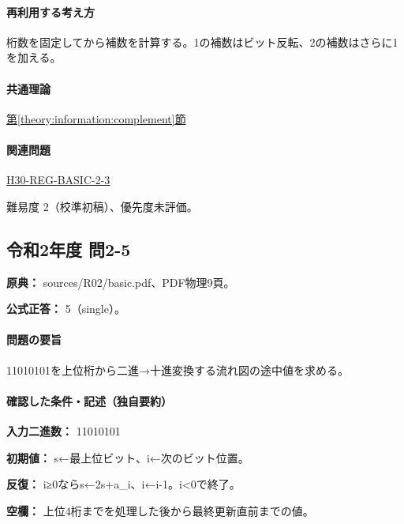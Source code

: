 \paragraph{再利用する考え方} 桁数を固定してから補数を計算する。1の補数はビット反転、2の補数はさらに1を加える。

\paragraph{共通理論} \hyperref[theory:information:complement]{第\ref*{theory:information:complement}節}

\paragraph{関連問題} \hyperref[q:h30-reg-basic-2-3]{H30-REG-BASIC-2-3}

\par 難易度 2（校準初稿）、優先度未評価。

\subsection{令和2年度 問2-5}
\label{q:r02-reg-basic-2-5}

\noindent\textbf{原典：} sources/R02/basic.pdf、PDF物理9頁。

\textbf{公式正答：} 5（single）。

\paragraph{問題の要旨} 11010101を上位桁から二進→十進変換する流れ図の途中値を求める。

\paragraph{確認した条件・記述（独自要約）}\mbox{}\par

\noindent\textbf{入力二進数：} 11010101\par

\noindent\textbf{初期値：} s←最上位ビット、i←次のビット位置。\par

\noindent\textbf{反復：} i≥0ならs←2s+a\_i、i←i-1。i<0で終了。\par

\noindent\textbf{空欄：} 上位4桁までを処理した後から最終更新直前までの値。\par

